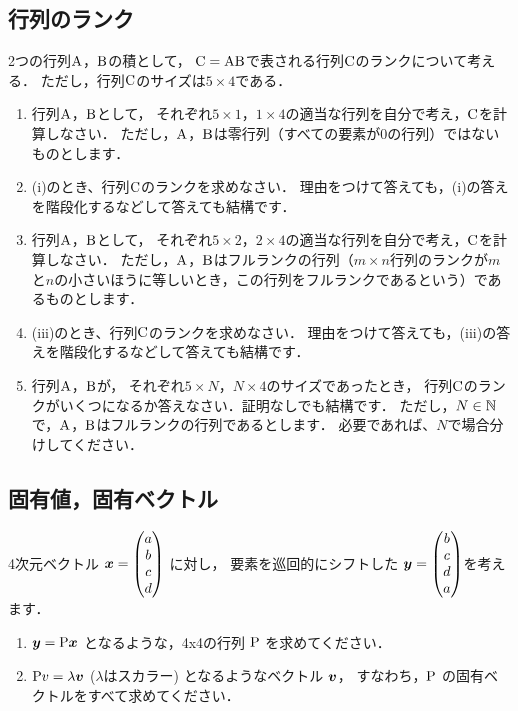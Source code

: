 \subsection{行列のランク}
  2つの行列$\mathrm{A}$，$\mathrm{B}$の積として，
  $\mathrm{C}=\mathrm{A}\mathrm{B}$で表される行列$\mathrm{C}$のランクについて考える．
  ただし，行列$\mathrm{C}$のサイズは$5\times 4$である．

  \begin{enumerate}[label=(\roman*)]
    \item 行列$\mathrm{A}$，$\mathrm{B}$として，
      それぞれ$5\times 1$，$1\times 4$の適当な行列を自分で考え，$\mathrm{C}$を計算しなさい．
      ただし，$\mathrm{A}$，$\mathrm{B}$は零行列（すべての要素が0の行列）ではないものとします．
    \item (i)のとき、行列$\mathrm{C}$のランクを求めなさい．
      理由をつけて答えても，(i)の答えを階段化するなどして答えても結構です．
    \item 行列$\mathrm{A}$，$\mathrm{B}$として，
      それぞれ$5\times 2$，$2\times 4$の適当な行列を自分で考え，$\mathrm{C}$を計算しなさい．
      ただし，$\mathrm{A}$，$\mathrm{B}$はフルランクの行列（$m\times n$行列のランクが$m$と$n$の小さいほうに等しいとき，この行列をフルランクであるという）であるものとします．
    \item (iii)のとき、行列$\mathrm{C}$のランクを求めなさい．
      理由をつけて答えても，(iii)の答えを階段化するなどして答えても結構です．
    \item 行列$\mathrm{A}$，$\mathrm{B}$が，
      それぞれ$5\times N$，$N\times 4$のサイズであったとき，
      行列$\mathrm{C}$のランクがいくつになるか答えなさい．証明なしでも結構です．
      ただし，$N\in \mathbb{N}$で，$\mathrm{A}$，$\mathrm{B}$はフルランクの行列であるとします．
      必要であれば、$N$で場合分けしてください．
  \end{enumerate}

\subsection{固有値，固有ベクトル}
    4次元ベクトル $\boldsymbol{x} = \begin{pmatrix} a \\ b \\ c \\ d \end{pmatrix}$ に対し，
    要素を巡回的にシフトした $\boldsymbol{y} = \begin{pmatrix} b \\ c \\ d \\ a \end{pmatrix}$を考えます．
    \begin{enumerate}[label=(\roman*)]
      \item $\boldsymbol{y} = \mathrm{P}\boldsymbol{x}$ となるような，4x4の行列 $\mathrm{P}$ を求めてください．
      \item $\mathrm{P}v = \lambda \boldsymbol{v}$ ($\lambda$はスカラー) となるようなベクトル $\boldsymbol{v}$，
        すなわち，$\mathrm{P}$ の固有ベクトルをすべて求めてください．
    \end{enumerate}

